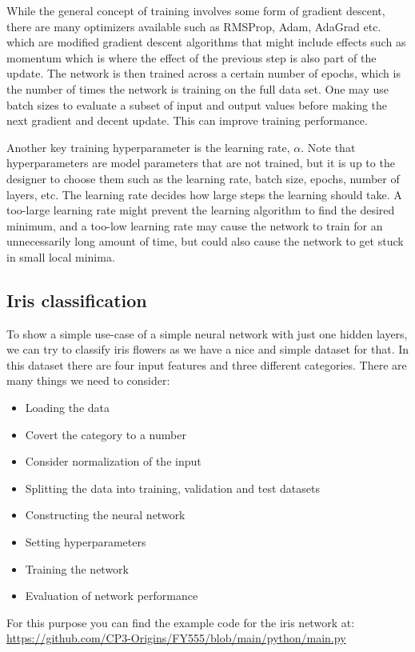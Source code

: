 \documentclass[11pt,a4paper]{article} %
\numberwithin{equation}{section}
\begin{document}
		While the general concept of training involves some form of gradient descent, there are many optimizers available such as RMSProp, Adam, AdaGrad etc. which are modified gradient descent algorithms that might include effects such as momentum which is where the effect of the previous step is also part of the update. The network is then trained across a certain number of epochs, which is the number of times the network is training on the full data set. One may use batch sizes to evaluate a subset of input and output values before making the next gradient and decent update. This can improve training performance.
		
		Another key training hyperparameter is the learning rate, $\alpha$. Note that hyperparameters are model parameters that are not trained, but it is up to the designer to choose them such as the learning rate, batch size, epochs, number of layers, etc. The learning rate decides how large steps the learning should take. A too-large learning rate might prevent the learning algorithm to find the desired minimum, and a too-low learning rate may cause the network to train for an unnecessarily long amount of time, but could also cause the network to get stuck in small local minima. 
	
	\subsection{Iris classification}
		To show a simple use-case of a simple neural network with just one hidden layers, we can try to classify iris flowers as we have a nice and simple dataset for that. In this dataset there are four input features and three different categories. There are many things we need to consider:
		\begin{itemize}
			\item Loading the data
			\item Covert the category to a number
			\item Consider normalization of the input
			\item Splitting the data into training, validation and test datasets
			\item Constructing the neural network
			\item Setting hyperparameters
			\item Training the network
			\item Evaluation of network performance
		\end{itemize}
    	For this purpose you can find the example code for the iris network at: \url{https://github.com/CP3-Origins/FY555/blob/main/python/main.py}
    	
\end{document}

